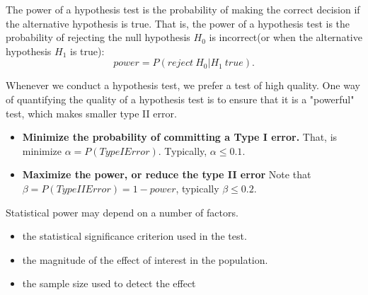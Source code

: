 \begin{refsection}





\begin{definition}
The power of a hypothesis test is the probability of making the correct decision if the alternative hypothesis is true. That is, the power of a hypothesis test is the probability of rejecting the null hypothesis $H_0$ is incorrect(or when the alternative hypothesis $H_1$ is true):
$$power = P(reject ~ H_0| H_1 ~ true).$$
\end{definition}

\begin{remark}[motivations]
	Whenever we conduct a hypothesis test, we prefer a test of high quality. One way of quantifying the quality of a hypothesis test is to ensure that it is a "powerful" test, which makes smaller type II error. 
\end{remark}

\begin{remark}\hfill
\begin{itemize}
	\item \textbf{Minimize the probability of committing a Type I error.} That, is minimize $\alpha = P(Type I Error)$. Typically, $\alpha \leq 0.1$.
	\item \textbf{Maximize the power, or reduce the type II error} Note that $\beta = P(Type II Error) = 1 - power$, typically $\beta \leq 0.2$.
\end{itemize}
\end{remark}



\begin{remark}
	Statistical power may depend on a number of factors. \begin{itemize}
		\item the statistical significance criterion used in the test.
		\item the magnitude of the effect of interest in the population.
		\item the sample size used to detect the effect
	\end{itemize}
\end{remark}


\end{refsection}

